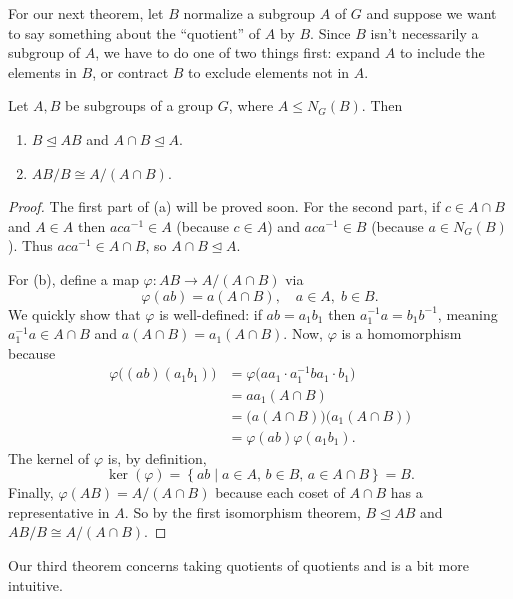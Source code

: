 \documentclass[../m171main.tex]{subfiles}
\begin{document}
For our next theorem, let $B$ normalize a subgroup $A$ of $G$ and suppose we want to say something about the ``quotient'' of $A$ by $B$.
Since $B$ isn't necessarily a subgroup of $A$, we have to do one of two things first: expand $A$ to include the elements in $B$, or contract $B$ to exclude elements not in $A$.

\begin{theorem}
    Let $A,B$ be subgroups of a group $G$, where $A \leq N_G(B)$.
    Then
    \begin{enumerate}[label=(\alph*)]
        \item $B \trianglelefteq AB$ and $A \cap B \trianglelefteq A$.
        \item $AB / B \cong A / (A \cap B)$.
    \end{enumerate}
\end{theorem}

\begin{proof}
    The first part of (a) will be proved soon.
    For the second part, if $c \in A \cap B$ and $A \in A$ then $aca^{-1} \in A$ (because $c \in A$) and $aca^{-1} \in B$ (because $a \in N_G(B)$).
    Thus $aca^{-1} \in A \cap B$, so $A \cap B \trianglelefteq A$.

    For (b), define a map $\varphi : AB \to A / (A \cap B)$ via
    \[ \varphi(ab) = a (A \cap B), \quad a \in A, \; b \in B. \]
    We quickly show that $\varphi$ is well-defined: if $ab = a_1b_1$ then $a_1^{-1} a = b_1b^{-1}$, meaning $a_1^{-1} a \in A \cap B$ and $a (A \cap B) = a_1 (A \cap B)$.
    Now, $\varphi$ is a homomorphism because
    \begin{align*}
        \varphi \big( (ab) (a_1 b_1) \big) &= \varphi \big( aa_1 \cdot a_1^{-1} b a_1 \cdot b_1 \big) \\
        &= aa_1 (A \cap B) \\
        &= \big( a (A \cap B) \big) \big( a_1 (A \cap B) \big) \\
        &= \varphi(ab) \varphi(a_1 b_1).
    \end{align*}
    The kernel of $\varphi$ is, by definition,
    \[ \ker(\varphi) = \left\{ ab \mid a \in A, \, b \in B, \, a \in A \cap B \right\} = B. \]
    Finally, $\varphi(AB) = A / (A \cap B)$ because each coset of $A \cap B$ has a representative in $A$.
    So by the first isomorphism theorem, $B \trianglelefteq AB$ and $AB / B \cong A / (A \cap B)$.
\end{proof}

Our third theorem concerns taking quotients of quotients and is a bit more intuitive.
\end{document}
